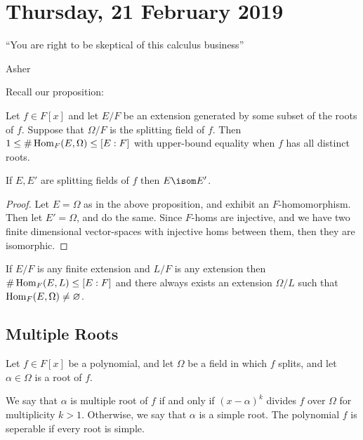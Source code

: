 
\section{Thursday, 21 February 2019}

\epigraph{``You are right to be skeptical of this calculus business''}{Asher}

Recall our proposition:

\begin{proposition}
Let $f \in F[x]$ and let $E/F$ be an extension generated by some subset of the roots of $f$. Suppose that $\Omega/F$ is the splitting field of $f$. Then $1 \leq \#\operatorname{Hom}_F(E,\Omega) \leq [E:F]$ with upper-bound equality when $f$ has all distinct roots.
\end{proposition}

\begin{corollary}
If $E,E'$ are splitting fields of $f$ then $E \isom E'$.
\end{corollary}

\begin{proof}
Let $E = \Omega$ as in the above proposition, and exhibit an $F$-homomorphism. Then let $E' = \Omega$, and do the same. Since $F$-homs are injective, and we have two finite dimensional vector-spaces with injective homs between them, then they are isomorphic.
\end{proof}

\begin{corollary}
If $E/F$ is any finite extension and $L/F$ is any extension then $\#\operatorname{Hom}_F(E,L) \leq [E:F]$ and there always exists an extension $\Omega/L$ such that $\operatorname{Hom}_F(E,\Omega) \not= \varnothing$.
\end{corollary}

\subsection{Multiple Roots}

Let $f \in F[x]$ be a polynomial, and let $\Omega$ be a field in which $f$ splits, and let $\alpha \in \Omega$ is a root of $f$.

\begin{definition}
We say that $\alpha$ is multiple root of $f$ if and only if $(x-\alpha)^k$ divides $f$ over $\Omega$ for multiplicity $k > 1$. Otherwise, we say that $\alpha$ is a simple root. The polynomial $f$ is seperable if every root is simple.
\end{definition}

